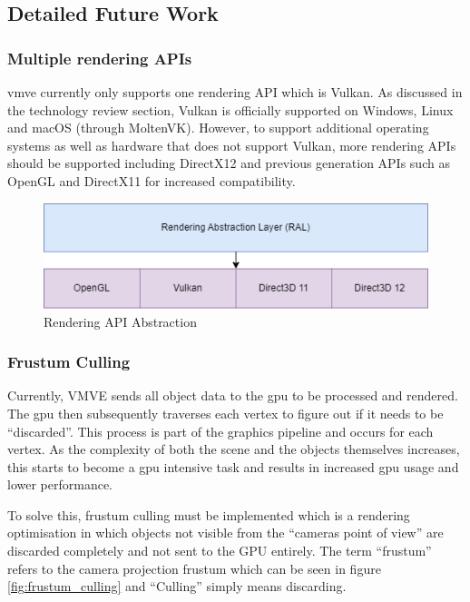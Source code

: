 \documentclass[11pt]{article}
\begin{document}
\subsection{Detailed Future Work} \label{detailed_future_work}

\subsubsection{Multiple rendering APIs}
\gls*{vmve} currently only supports one rendering API which is Vulkan. As
discussed in the technology review section, Vulkan is officially supported on
Windows, Linux and macOS (through MoltenVK). However, to support additional
operating systems as well as hardware that does not support Vulkan, more
rendering APIs should be supported including DirectX12 and previous generation
APIs such as OpenGL and DirectX11 for increased compatibility.

\begin{figure}[H]
  \centering
  \includegraphics[width=\textwidth]{images/api_abstraction.png}
  \caption{Rendering API Abstraction}
  \label{fig:api_abstraction}
\end{figure}

\subsubsection{Frustum Culling}
Currently, VMVE sends all object data to the \gls*{gpu} to be processed and
rendered. The \gls*{gpu} then subsequently traverses each vertex to figure out if
it needs to be ``discarded''. This process is part of the graphics pipeline and
occurs for each vertex. As the complexity of both the scene and the objects
themselves increases, this starts to become a \gls*{gpu} intensive task and
results in increased \gls*{gpu} usage and lower performance.

To solve this, frustum culling must be implemented which is a rendering
optimisation in which objects not visible from the ``cameras point of view'' are
discarded completely and not sent to the GPU entirely. The term ``frustum'' refers
to the camera projection frustum which can be seen in figure
\ref{fig:frustum_culling} and ``Culling'' simply means discarding.
\end{document}
